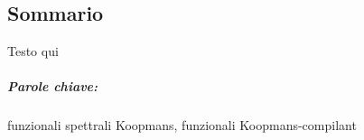 \begin{otherlanguage}{italian}
\cleardoublepage
\chapter*{Sommario}
\vspace{2cm}
%
Testo qui
%
\paragraph{Parole chiave:}
funzionali spettrali Koopmans,
funzionali Koopmans-compilant
%
\end{otherlanguage}

\endgroup			
\vfill
